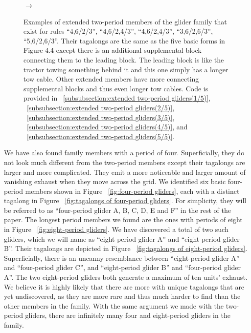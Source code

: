 \documentclass[12pt]{article}
\numberwithin{figure}{section} %
\begin{document}
\begin{figure}[H]
\begin{subfigure}{0.3\textwidth}
     		\subcaption{}
   	\end{subfigure}
      	{\LARGE$\xrightarrow{}$}
   	\setcounter{subfigure}{0}
   	\caption[Extended two-period gliders]{Examples of extended two-period members of the glider family that exist for rules “4,6/2/3”, “4,6/2,4/3”, “4,6/2,4/3”, “3,6/2,6/3”, “5,6/2,6/3”. Their tagalongs are the same as the five basic forms in Figure 4.4 except there is an additional supplemental block connecting them to the leading block. The leading block is like the tractor towing something behind it and this one simply has a longer tow cable. Other extended members have more connecting supplemental blocks and thus even longer tow cables. Code is provided in ~\ref{subsubsection:extended two-period gliders(1/5)}, ~\ref{subsubsection:extended two-period gliders(2/5)}, ~\ref{subsubsection:extended two-period gliders(3/5)}, ~\ref{subsubsection:extended two-period gliders(4/5)}, and ~\ref{subsubsection:extended two-period gliders(5/5)}. }
   	\label{fig:extended two-period gliders}
   	\vspace{-1.5em}
\end{figure}

We have also found family members with a period of four. Superficially, they do not look much different from the two-period members except their tagalongs are larger and more complicated. They emit a more noticeable and larger amount of vanishing exhaust when they move across the grid. We identified six basic four-period members shown in Figure ~\ref{fig:four-period gliders}, each with a distinct tagalong in Figure ~\ref{fig:tagalongs of four-period gliders}. For simplicity, they will be referred to as “four-period glider A, B, C, D, E and F” in the rest of the paper. The longest period members we found are the ones with periods of eight in Figure ~\ref{fig:eight-period gliders}. We have discovered a total of two such gliders, which we will name as “eight-period glider A” and “eight-period glider B”. Their tagalongs are depicted in Figure ~\ref{fig:tagalongs of eight-period gliders}. Superficially, there is an uncanny resemblance between “eight-period glider A” and “four-period glider C”, and “eight-period glider B” and “four-period glider A”. The two eight-period gliders both generate a maximum of ten units’ exhaust. We believe it is highly likely that there are more with unique tagalongs that are yet undiscovered, as they are more rare and thus much harder to find than the other members in the family. With the same argument we made with the two-period gliders, there are infinitely many four and eight-period gliders in the family. 
\end{document}
